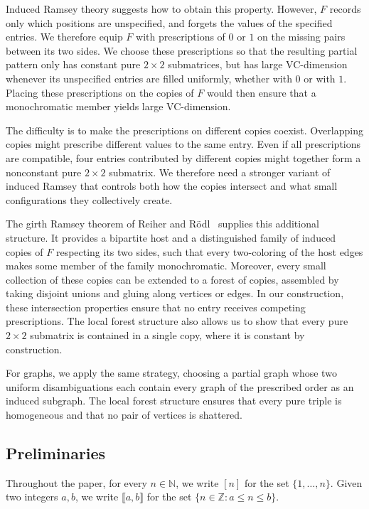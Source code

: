 \documentclass[11pt]{article}
\theoremstyle{remark}
\begin{document}
Induced Ramsey theory suggests how to obtain this property.
However, $F$ records only which positions are unspecified, and forgets the values of the specified entries.
We therefore equip $F$ with prescriptions of $0$ or $1$ on the missing pairs between its two sides.
We choose these prescriptions so that the resulting partial pattern only has constant pure $2\times2$ submatrices, but has large VC-dimension whenever its unspecified entries are filled uniformly, whether with $0$ or with $1$.
Placing these prescriptions on the copies of $F$ would then ensure that a monochromatic member yields large VC-dimension.

The difficulty is to make the prescriptions on different copies coexist.
Overlapping copies might prescribe different values to the same entry.
Even if all prescriptions are compatible, four entries contributed by different copies might together form a nonconstant pure $2\times2$ submatrix.
We therefore need a stronger variant of induced Ramsey that controls both how the copies intersect and what small configurations they collectively create.

The girth Ramsey theorem of Reiher and Rödl~\cite{RR23} supplies this additional structure.
It provides a bipartite host and a distinguished family of induced copies of $F$ respecting its two sides, such that every two-coloring of the host edges makes some member of the family monochromatic.
Moreover, every small collection of these copies can be extended to a forest of copies, assembled by taking disjoint unions and gluing along vertices or edges.
In our construction, these intersection properties ensure that no entry receives competing prescriptions.
The local forest structure also allows us to show that every pure $2\times2$ submatrix is contained in a single copy, where it is constant by construction.

For graphs, we apply the same strategy, choosing a partial graph whose two uniform disambiguations each contain every graph of the prescribed order as an induced subgraph.
The local forest structure ensures that every pure triple is homogeneous and that no pair of vertices is shattered.

\subsection*{Preliminaries}

Throughout the paper, for every $n \in \mathbb{N}$, we write $[n]$ for the set $\{1, \ldots, n\}$. 
Given two integers $a, b$, we write $\llbracket a, b\rrbracket$ for the set $\{n \in \mathbb{Z} : a \leq n \leq b\}$.
\end{document}
